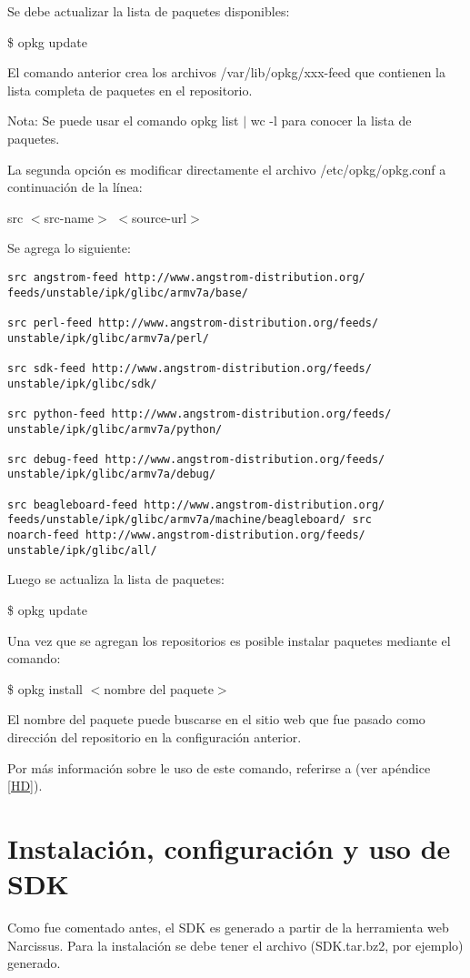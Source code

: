 \bigskip
Se debe actualizar la lista de paquetes disponibles:

\bigskip
\centerline{\$ opkg update}

\bigskip
El comando anterior crea los archivos /var/lib/opkg/xxx-feed que contienen la lista completa de paquetes en el repositorio. 

\bigskip
Nota: Se puede usar el comando opkg list $|$ wc -l para conocer la lista de paquetes. 

\bigskip
La segunda opción es modificar directamente el archivo /etc/opkg/opkg.conf a continuación de la línea: 

\bigskip
src $<$src-name$>$ $<$source-url$>$

\bigskip
Se agrega lo siguiente: 

\begin{verbatim}
src angstrom-feed http://www.angstrom-distribution.org/
feeds/unstable/ipk/glibc/armv7a/base/ 

src perl-feed http://www.angstrom-distribution.org/feeds/
unstable/ipk/glibc/armv7a/perl/ 

src sdk-feed http://www.angstrom-distribution.org/feeds/
unstable/ipk/glibc/sdk/ 

src python-feed http://www.angstrom-distribution.org/feeds/
unstable/ipk/glibc/armv7a/python/ 

src debug-feed http://www.angstrom-distribution.org/feeds/
unstable/ipk/glibc/armv7a/debug/ 

src beagleboard-feed http://www.angstrom-distribution.org/
feeds/unstable/ipk/glibc/armv7a/machine/beagleboard/ src 
noarch-feed http://www.angstrom-distribution.org/feeds/
unstable/ipk/glibc/all/ 
\end{verbatim}

Luego se actualiza la lista de paquetes:

\centerline{\$ opkg update}

\bigskip
Una vez que se agregan los repositorios es posible instalar paquetes mediante el comando: 

\bigskip
\centerline{\$ opkg install $<$nombre del paquete$>$}

\bigskip
El nombre del paquete puede buscarse en el sitio web que fue pasado como dirección del repositorio en la configuración anterior.

\bigskip
Por más información sobre le uso de este comando, referirse a \cite{AngManual} (ver apéndice \ref{HD}).

\section{Instalación, configuración y uso de SDK}\label{anx_sw_SDK}
Como fue comentado antes, el SDK es generado a partir de la herramienta web Narcissus. Para la instalación se debe tener el archivo (SDK.tar.bz2, por ejemplo) generado.

